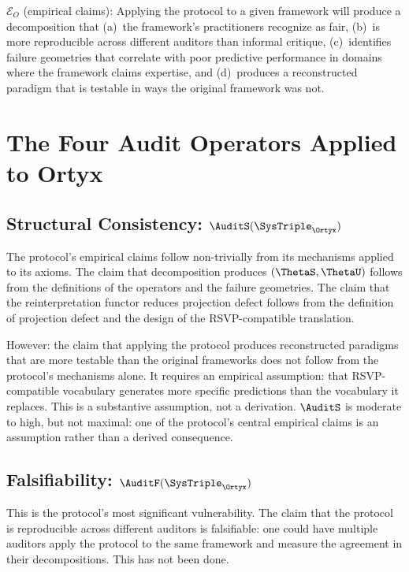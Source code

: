 $\mathcal{E}_O$ (empirical claims): Applying the protocol
to a given framework will produce a decomposition that
(a)~the framework's practitioners recognize as fair,
(b)~is more reproducible across different auditors
than informal critique, (c)~identifies failure geometries
that correlate with poor predictive performance in
domains where the framework claims expertise, and
(d)~produces a reconstructed paradigm that is testable
in ways the original framework was not.

\section{The Four Audit Operators Applied to Ortyx}
\label{sec:ortyx-operators}

\subsection{Structural Consistency: \texorpdfstring{$\AuditS(\SysTriple_{\Ortyx})$}{S(Ortyx)}}

The protocol's empirical claims follow non-trivially
from its mechanisms applied to its axioms. The claim
that decomposition produces $(\ThetaS, \ThetaU)$
follows from the definitions of the operators and the
failure geometries. The claim that the reinterpretation
functor reduces projection defect follows from the
definition of projection defect and the design of the
RSVP-compatible translation.

However: the claim that applying the protocol produces
reconstructed paradigms that are more testable than
the original frameworks does not follow from the
protocol's mechanisms alone. It requires an empirical
assumption: that RSVP-compatible vocabulary generates
more specific predictions than the vocabulary it
replaces. This is a substantive assumption, not a
derivation. $\AuditS$ is moderate to high, but not
maximal: one of the protocol's central empirical claims
is an assumption rather than a derived consequence.

\subsection{Falsifiability: \texorpdfstring{$\AuditF(\SysTriple_{\Ortyx})$}{F(Ortyx)}}

This is the protocol's most significant vulnerability.
The claim that the protocol is reproducible across
different auditors is falsifiable: one could have multiple
auditors apply the protocol to the same framework and
measure the agreement in their decompositions. This
has not been done.

